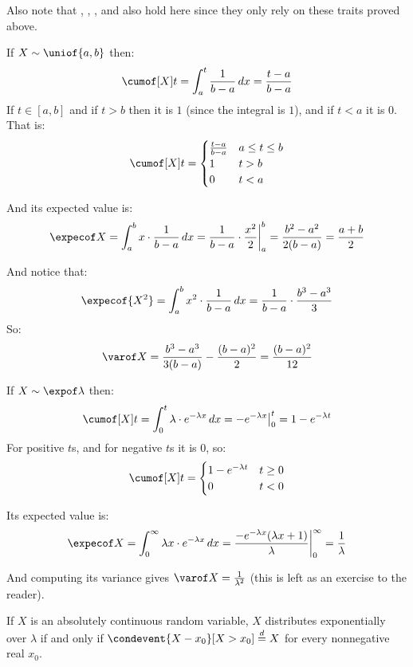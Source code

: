 Also note that , , , and  also hold here since they only rely on these traits
proved above.

\begin{exam}

	If $X\sim\uniof{a,b}$ then:
	\[ \cumof[X]t = \int_a^t \frac{1}{b-a}\,dx = \frac{t-a}{b-a} \]
	If $t\in[a,b]$ and if $t>b$ then it is $1$ (since the integral is $1$), and if $t<a$ it is $0$.
	That is:
	\[ \cumof[X]t = \begin{cases} \frac{t-a}{b-a} & a\leq t\leq b \\ 1 & t>b \\ 0 & t<a \end{cases} \]
	
	And its expected value is:
	\[ \expecof X = \int_a^b x\cdot\frac1{b-a}\,dx = \frac1{b-a}\cdot\frac{x^2}2\bigg|_a^b = \frac{b^2-a^2}{2(b-a)} = \frac{a+b}2 \]

	And notice that:
	\[ \expecof{X^2} = \int_a^b x^2\cdot\frac1{b-a}\,dx = \frac1{b-a}\cdot\frac{b^3-a^3}{3} \]
	So:
	\[ \varof X = \frac{b^3-a^3}{3(b-a)} - \frac{(b-a)^2}2 = \frac{(b-a)^2}{12} \]

\end{exam}

\begin{exam}

	If $X\sim\expof\lambda$ then:
	\[ \cumof[X]t = \int_0^t \lambda\cdot e^{-\lambda x}\,dx = -e^{-\lambda x}\big|_0^t = 1 - e^{-\lambda t} \]
	For positive $t$s, and for negative $t$s it is $0$, so:
	\[ \cumof[X]t = \begin{cases} 1 - e^{-\lambda t} & t\geq0 \\ 0 & t<0 \end{cases} \]

	Its expected value is:
	\[ \expecof X = \int_0^\infty \lambda x\cdot e^{-\lambda x}\,dx = \frac{-e^{-\lambda x}(\lambda x+1)}{\lambda}\bigg|_0^\infty = \frac1\lambda \]

	And computing its variance gives $\varof X=\frac1{\lambda^2}$ (this is left as an exercise to the reader).

\end{exam}

\begin{thrm*}

	If $X$ is an absolutely continuous random variable, $X$ distributes exponentially over $\lambda$ if and only if $\condevent{X-x_0}[X>x_0]\deq X$
	for every nonnegative real $x_0$.

\end{thrm*}

